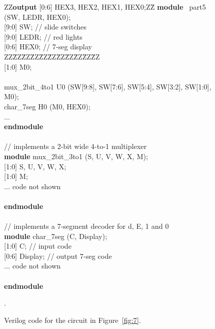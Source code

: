 \documentclass[epsfig,10pt,fullpage]{article}
\begin{document}
\begin{figure}[ht]
\begin{center}
\begin{minipage}[t]{12.5 cm}
\begin{tabbing}
ZZ\={\bf output} [0:6] HEX3, HEX2, HEX1, HEX0;ZZ\=\kill
{\bf module} ~part5 (SW, LEDR, HEX0);\\
 [9:0] SW;	\>// slide switches\\
 [9:0] LEDR;	\>// red lights\\
 [0:6] HEX0;	\>// 7-seg display\\
ZZ\=ZZ\=ZZ\=ZZ\=ZZ\=ZZ\=ZZ\=ZZ\=ZZ\=ZZ\=ZZ\kill
~\\
 [1:0] M0;\\
~\\
\>mux\_2bit\_4to1 U0 (SW[9:8], SW[7:6], SW[5:4], SW[3:2], SW[1:0], M0);\\
\>char\_7seg H0 (M0, HEX0);\\
\>$\ldots$\\
{\bf endmodule}\\
~\\
// implements a 2-bit wide 4-to-1 multiplexer\\
{\bf module} mux\_2bit\_3to1 (S, U, V, W, X, M);\\
 [1:0] S, U, V, W, X;\\
 [1:0] M;\\
\>$\ldots$ code not shown\\
~\\
{\bf endmodule}	\\
~\\
// implements a 7-segment decoder for d, E, 1 and 0\\
{\bf module} char\_7seg (C, Display);\\
 [1:0] C;	\>\>\>\>\>\>\>\>// input code\\
 [0:6] Display;	\>\>\>\>\>\>\>\>// output 7-seg code\\
\>$\ldots$ code not shown\\
~\\
{\bf endmodule}
\end{tabbing}
\end{minipage}
\end{center}
\caption{Verilog code for the circuit in  Figure~\ref{fig:7}.}.
\label{fig:8}
\end{figure}
\end{document}
